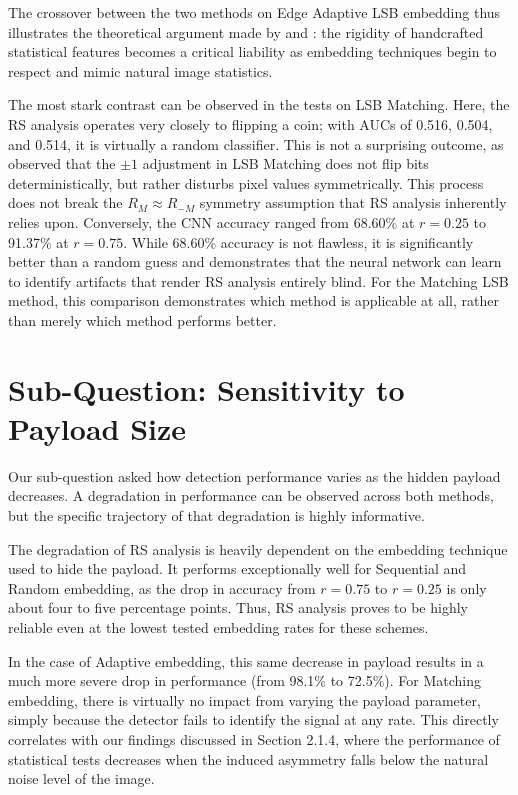 The crossover between the two methods on Edge Adaptive LSB embedding thus illustrates the theoretical argument made by \textcite{Qian2015} 
and \textcite{Apau2024}: the rigidity of handcrafted statistical features becomes a critical liability as embedding techniques begin to respect 
and mimic natural image statistics.

The most stark contrast can be observed in the tests on LSB Matching. 
Here, the RS analysis operates very closely to flipping a coin; with AUCs of 0.516, 0.504, and 0.514, it is virtually a random classifier. 
This is not a surprising outcome, as \textcite{Ker2005} observed that the $\pm 1$ adjustment in LSB Matching does not flip bits deterministically, 
but rather disturbs pixel values symmetrically. 
This process does not break the $R_M \approx R_{-M}$ symmetry assumption that RS analysis inherently relies upon. 
Conversely, the CNN accuracy ranged from 68.60\% at $r = 0.25$ to 91.37\% at $r = 0.75$. While 68.60\% accuracy is not flawless, 
it is significantly better than a random guess and demonstrates that the neural network can learn to identify artifacts that render RS analysis entirely blind. 
For the Matching LSB method, this comparison demonstrates which method is applicable at all, rather than merely which method performs better.

\section{Sub-Question: Sensitivity to Payload Size}

Our sub-question asked how detection performance varies as the hidden payload decreases. 
A degradation in performance can be observed across both methods, but the specific trajectory of that degradation is highly informative.

The degradation of RS analysis is heavily dependent on the embedding technique used to hide the payload. 
It performs exceptionally well for Sequential and Random embedding, as the drop in accuracy from $r = 0.75$ to $r = 0.25$ is only 
about four to five percentage points. 
Thus, RS analysis proves to be highly reliable even at the lowest tested embedding rates for these schemes.

In the case of Adaptive embedding, this same decrease in payload results in a much more severe drop in performance (from 98.1\% to 72.5\%). 
For Matching embedding, there is virtually no impact from varying the payload parameter, simply because the detector fails to identify the 
signal at any rate. 
This directly correlates with our findings discussed in Section 2.1.4, where the performance of statistical tests decreases when the induced 
asymmetry falls below the natural noise level of the image.

